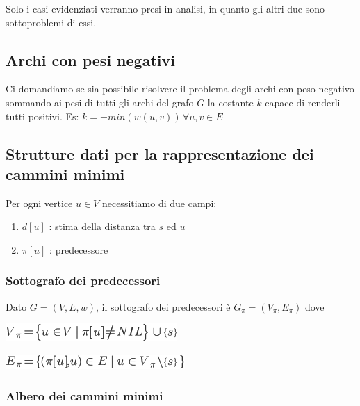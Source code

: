\documentclass{article}
\providecommand{\tightlist}{%
  \setlength{\itemsep}{0pt}\setlength{\parskip}{0pt}}
\begin{document}
{{{{}

{Solo i casi evidenziati verranno presi in analisi, in quanto gli altri
due sono sottoproblemi di essi.}

{}

\subsection{\texorpdfstring{{Archi con pesi negativi}}{Archi con pesi negativi}}\label{h.tf12b72w5l3}

{Ci domandiamo se sia possibile risolvere il problema degli archi con peso negativo sommando ai pesi di tutti gli archi del grafo $G$ la costante $k$ capace di renderli tutti positivi. Es: $k=-min(w(u,v))\,\forall u,v \in E$}

\subsection{\texorpdfstring{{Strutture dati per la rappresentazione dei cammini minimi}}{Strutture dati per la rappresentazione dei cammini minimi}}\label{h.ee7q1txmgnne}

{}

{Per ogni vertice $u \in V$ necessitiamo di due campi:}

\begin{enumerate}
\tightlist
\item
$d[u]$ : stima della distanza tra $s$ ed $u$
\item
$\pi[u]$ : predecessore
\end{enumerate}

\subsubsection{\texorpdfstring{{Sottografo dei predecessori}}{Sottografo dei predecessori}}\label{h.ky1vo2u762au}

{Dato $G=(V,E,w)$, il sottografo dei predecessori è $G_\pi=(V_\pi,E_\pi)$ dove}

\includegraphics{images/image512.png}{~}

\includegraphics{images/image513.png}{~}

\subsubsection{\texorpdfstring{{Albero dei cammini minimi}}{Albero dei cammini minimi}}\label{h.2lffyamho46s}

}}}
\end{document}
